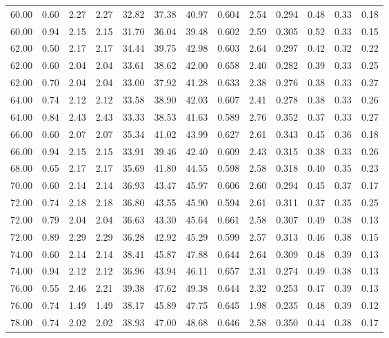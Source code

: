 \begin{longtable}{lc|cccc|cc|cc|ccc}
60.00 & 0.60 & 2.27 & 2.27 & 32.82 & 37.38 & 40.97 & 0.604 & 2.54 & 0.294 & 0.48 & 0.33 & 0.18\\
60.00 & 0.94 & 2.15 & 2.15 & 31.70 & 36.04 & 39.48 & 0.602 & 2.59 & 0.305 & 0.52 & 0.33 & 0.15\\
\hline
62.00 & 0.50 & 2.17 & 2.17 & 34.44 & 39.75 & 42.98 & 0.603 & 2.64 & 0.297 & 0.42 & 0.32 & 0.22\\
62.00 & 0.60 & 2.04 & 2.04 & 33.61 & 38.62 & 42.00 & 0.658 & 2.40 & 0.282 & 0.39 & 0.33 & 0.25\\
62.00 & 0.70 & 2.04 & 2.04 & 33.00 & 37.92 & 41.28 & 0.633 & 2.38 & 0.276 & 0.38 & 0.33 & 0.27\\
\hline
64.00 & 0.74 & 2.12 & 2.12 & 33.58 & 38.90 & 42.03 & 0.607 & 2.41 & 0.278 & 0.38 & 0.33 & 0.26\\
64.00 & 0.84 & 2.43 & 2.43 & 33.33 & 38.53 & 41.63 & 0.589 & 2.76 & 0.352 & 0.37 & 0.33 & 0.27\\
\hline
66.00 & 0.60 & 2.07 & 2.07 & 35.34 & 41.02 & 43.99 & 0.627 & 2.61 & 0.343 & 0.45 & 0.36 & 0.18\\
66.00 & 0.94 & 2.15 & 2.15 & 33.91 & 39.46 & 42.40 & 0.609 & 2.43 & 0.315 & 0.38 & 0.33 & 0.26\\
\hline
68.00 & 0.65 & 2.17 & 2.17 & 35.69 & 41.80 & 44.55 & 0.598 & 2.58 & 0.318 & 0.40 & 0.35 & 0.23\\
\hline
70.00 & 0.60 & 2.14 & 2.14 & 36.93 & 43.47 & 45.97 & 0.606 & 2.60 & 0.294 & 0.45 & 0.37 & 0.17\\
\hline
72.00 & 0.74 & 2.18 & 2.18 & 36.80 & 43.55 & 45.90 & 0.594 & 2.61 & 0.311 & 0.37 & 0.35 & 0.25\\
72.00 & 0.79 & 2.04 & 2.04 & 36.63 & 43.30 & 45.64 & 0.661 & 2.58 & 0.307 & 0.49 & 0.38 & 0.13\\
72.00 & 0.89 & 2.29 & 2.29 & 36.28 & 42.92 & 45.29 & 0.599 & 2.57 & 0.313 & 0.46 & 0.38 & 0.15\\
\hline
74.00 & 0.60 & 2.14 & 2.14 & 38.41 & 45.87 & 47.88 & 0.644 & 2.64 & 0.309 & 0.48 & 0.39 & 0.13\\
74.00 & 0.94 & 2.12 & 2.12 & 36.96 & 43.94 & 46.11 & 0.657 & 2.31 & 0.274 & 0.49 & 0.38 & 0.13\\
\hline
76.00 & 0.55 & 2.46 & 2.21 & 39.38 & 47.62 & 49.38 & 0.644 & 2.32 & 0.253 & 0.47 & 0.39 & 0.13\\
76.00 & 0.74 & 1.49 & 1.49 & 38.17 & 45.89 & 47.75 & 0.645 & 1.98 & 0.235 & 0.48 & 0.39 & 0.12\\
\hline
78.00 & 0.74 & 2.02 & 2.02 & 38.93 & 47.00 & 48.68 & 0.646 & 2.58 & 0.350 & 0.44 & 0.38 & 0.17\\

\end{longtable}
